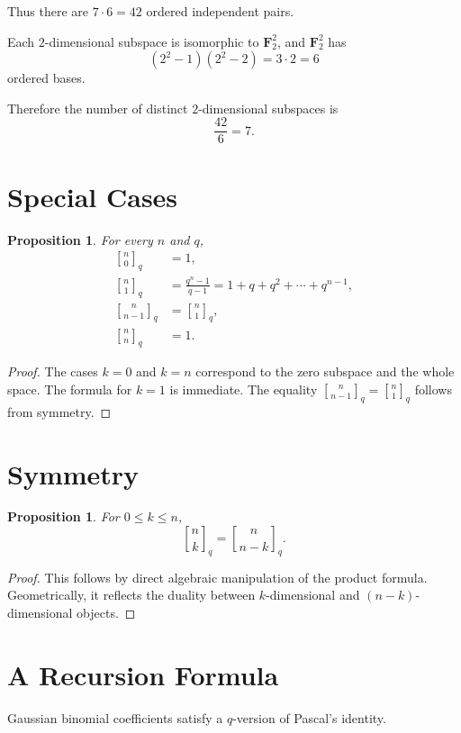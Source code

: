\documentclass[11pt]{article}
\newtheorem{proposition}[theorem]{Proposition}
\theoremstyle{definition}
\theoremstyle{remark}
\newcommand{\F}{\mathbf{F}}
\newcommand{\qbinom}[2]{\genfrac{[}{]}{0pt}{}{#1}{#2}_q}
\begin{document}
	Thus there are \(7\cdot 6=42\) ordered independent pairs.
	
	Each \(2\)-dimensional subspace is isomorphic to \(\F_2^2\), and \(\F_2^2\) has
	\[
	(2^2-1)(2^2-2)=3\cdot 2=6
	\]
	ordered bases.
	
	Therefore the number of distinct \(2\)-dimensional subspaces is
	\[
	\frac{42}{6}=7.
	\]
	
	\section{Special Cases}
	
	\begin{proposition}
		For every \(n\) and \(q\),
		\begin{align*}
			\qbinom{n}{0} &= 1,\\
			\qbinom{n}{1} &= \frac{q^n-1}{q-1}=1+q+q^2+\cdots+q^{n-1},\\
			\qbinom{n}{n-1} &= \qbinom{n}{1},\\
			\qbinom{n}{n} &= 1.
		\end{align*}
	\end{proposition}
	
	\begin{proof}
		The cases \(k=0\) and \(k=n\) correspond to the zero subspace and the whole space. The formula for \(k=1\) is immediate. The equality \(\qbinom{n}{n-1}=\qbinom{n}{1}\) follows from symmetry.
	\end{proof}
	
	\section{Symmetry}
	
	\begin{proposition}
		For \(0\le k\le n\),
		\[
		\qbinom{n}{k}=\qbinom{n}{n-k}.
		\]
	\end{proposition}
	
	\begin{proof}
		This follows by direct algebraic manipulation of the product formula. Geometrically, it reflects the duality between \(k\)-dimensional and \((n-k)\)-dimensional objects.
	\end{proof}
	
	\section{A Recursion Formula}
	
	Gaussian binomial coefficients satisfy a \(q\)-version of Pascal's identity.
	
\end{document}
